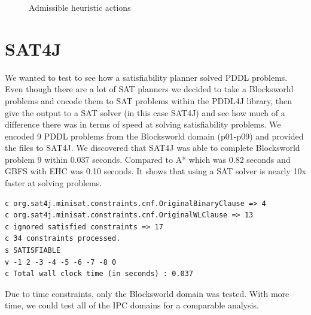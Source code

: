 \begin{figure}[!tbp]
  \centering
  \hfill
  \caption{Admissible heuristic actions}
\end{figure}

\clearpage 
\section{SAT4J}
We wanted to test to see how a satisfiability planner solved PDDL problems. Even though there are a lot of SAT planners\cite{BlackBox}\cite{SATPLAN} we decided to take a Blocksworld problems and encode them to SAT problems within the PDDL4J library, then give the output to a SAT solver (in this case SAT4J) and see how much of a difference there was in terms of speed at solving satisfiability problems. We encoded 9 PDDL problems from the Blocksworld domain (p01-p09) and provided the files to SAT4J. 
We discovered that SAT4J was able to complete Blocksworld problem 9 within 0.037 seconds. Compared to A* which was 0.82 seconds and GBFS with EHC was 0.10 seconds. It shows that using a SAT solver is nearly 10x faster at solving problems. 
\begin{verbatim}
c org.sat4j.minisat.constraints.cnf.OriginalBinaryClause => 4
c org.sat4j.minisat.constraints.cnf.OriginalWLClause => 13
c ignored satisfied constraints => 17
c 34 constraints processed.
s SATISFIABLE
v -1 2 -3 -4 -5 -6 -7 -8 0
c Total wall clock time (in seconds) : 0.037
\end{verbatim}
Due to time constraints, only the Blocksworld domain was tested. With more time, we could test all of the IPC domains for a comparable analysis. 
